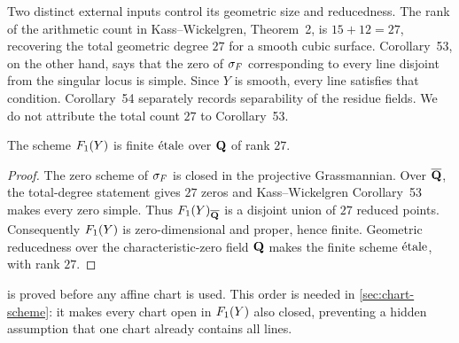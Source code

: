 Two distinct external inputs control its geometric size and reducedness.
The rank of the arithmetic count in Kass--Wickelgren, Theorem~2, is
\(15+12=27\), recovering the total geometric degree \(27\) for a smooth
cubic surface.  Corollary~53, on the other hand, says that the zero of
\(\sigma_F\) corresponding to every line disjoint from the singular locus is
simple.  Since \(Y\) is smooth, every line satisfies that condition.
Corollary~54 separately records separability of the residue fields.  We do
not attribute the total count \(27\) to Corollary~53.

\begin{proposition}
\label{prop:fano-etale}
The scheme \(F_1(Y)\) is finite \(\mathrm{\acute{e}tale}\) over \(\mathbf Q\) of rank \(27\).
\end{proposition}

\begin{proof}
The zero scheme of \(\sigma_F\) is closed in the projective Grassmannian.  Over
\(\overline{\mathbf Q}\), the total-degree statement gives \(27\) zeros and
Kass--Wickelgren Corollary~53 makes every zero simple.  Thus
\(F_1(Y)_{\overline{\mathbf Q}}\) is a disjoint union of \(27\) reduced points.
Consequently \(F_1(Y)\) is zero-dimensional and proper, hence finite.
Geometric reducedness over the characteristic-zero field \(\mathbf Q\) makes the
finite scheme \(\mathrm{\acute{e}tale}\), with rank \(27\).
\end{proof}

\begin{remark}
\label{rem:global-first}
 is proved before any affine chart is used.  This order
is needed in \cref{sec:chart-scheme}: it makes every chart open in
\(F_1(Y)\) also closed, preventing a hidden assumption that one chart already
contains all lines.
\end{remark}
